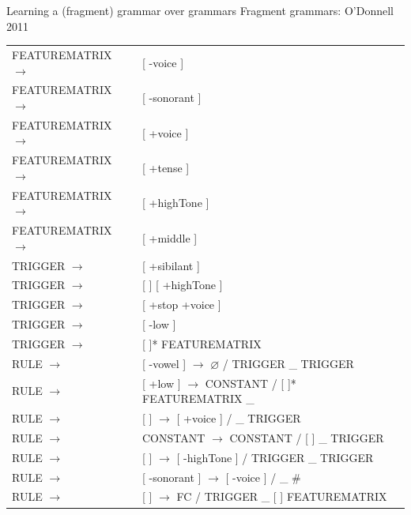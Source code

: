 \documentclass{beamer}
\begin{document}
\begin{frame}{Learning a (fragment) grammar over grammars}
  Fragment grammars: O'Donnell 2011
  \small
\begin{tabular}{ll}
    FEATUREMATRIX $\to$& [ -voice ]\\
     FEATUREMATRIX $\to$& [ -sonorant ]\\
 FEATUREMATRIX $\to$& [ +voice ]\\
 FEATUREMATRIX $\to$& [ +tense ]\\
 FEATUREMATRIX $\to$& [ +highTone ]\\
 FEATUREMATRIX $\to$& [ +middle ]\\
 TRIGGER $\to$& [ +sibilant ]\\
 TRIGGER $\to$& [ ] [ +highTone ]\\
 TRIGGER $\to$& [ +stop +voice ]\\
 TRIGGER $\to$& [ -low ]\\
 TRIGGER $\to$& [ ]* FEATUREMATRIX\\
 RULE $\to$& [ -vowel ] $\to$ $\varnothing$ / TRIGGER \_ TRIGGER\\
 RULE $\to$& [ +low ] $\to$ CONSTANT / [ ]* FEATUREMATRIX \_\\
 RULE $\to$& [ ] $\to$ [ +voice ] / \_ TRIGGER\\
 RULE $\to$& CONSTANT $\to$ CONSTANT / [ ] \_ TRIGGER\\
 RULE $\to$& [ ] $\to$ [ -highTone ] / TRIGGER \_ TRIGGER\\
 RULE $\to$& [ -sonorant ] $\to$ [ -voice ] / \_ \#\\
 RULE $\to$& [ ] $\to$ FC / TRIGGER \_ [ ] FEATUREMATRIX\\
    \end{tabular}
\end{frame}
\end{document}
